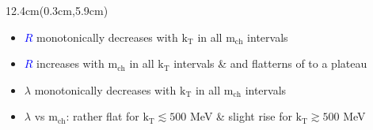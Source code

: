\documentclass[xcolor=dvipsnames]{beamer}
\begin{document}
\begin{frame}
\begin{textblock*}{12.4cm}(0.3cm,5.9cm) %
\small{
\begin{itemize}
 \item \textcolor{blue}{$R$} monotonically decreases with $\mathrm{k}_\mathrm{T}$ in all $\mathrm{m}_\mathrm{ch}$ intervals\\%
 \item \textcolor{blue}{$R$} increases with $\mathrm{m}_\mathrm{ch}$ in all $\mathrm{k}_\mathrm{T}$ intervals \& and flatterns of to a plateau\\%
 \item \textcolor{dgreen}{$\lambda$} monotonically decreases with $\mathrm{k}_\mathrm{T}$ in all $\mathrm{m}_\mathrm{ch}$ intervals\\%
 \item \textcolor{dgreen}{$\lambda$} vs $\mathrm{m}_\mathrm{ch}$: rather flat for $\mathrm{k}_\mathrm{T} \lesssim 500$ MeV \& slight rise for $\mathrm{k}_\mathrm{T} \gtrsim 500$ MeV\\\vspace{-0.05cm}
\end{itemize}
}
\end{textblock*}

\end{frame}
\end{document}
